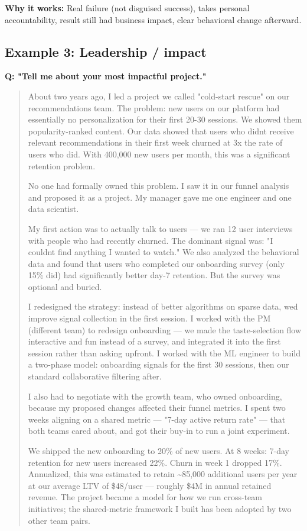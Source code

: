 \documentclass[11pt]{article}
\begin{document}
\textbf{Why it works:} Real failure (not disguised success), takes personal accountability, result still had business impact, clear behavioral change afterward.

\subsection{Example 3: Leadership / impact}\label{example-3-leadership--impact}

\textbf{Q: "Tell me about your most impactful project."}

\begin{quote}
About two years ago, I led a project we called "cold-start rescue" on our recommendations team. The problem: new users on our platform had essentially no personalization for their first 20-30 sessions. We showed them popularity-ranked content. Our data showed that users who didn\textquotesingle t receive relevant recommendations in their first week churned at 3x the rate of users who did. With 400,000 new users per month, this was a significant retention problem.

No one had formally owned this problem. I saw it in our funnel analysis and proposed it as a project. My manager gave me one engineer and one data scientist.

My first action was to actually talk to users --- we ran 12 user interviews with people who had recently churned. The dominant signal was: "I couldn\textquotesingle t find anything I wanted to watch." We also analyzed the behavioral data and found that users who completed our onboarding survey (only 15\% did) had significantly better day-7 retention. But the survey was optional and buried.

I redesigned the strategy: instead of better algorithms on sparse data, we\textquotesingle d improve signal collection in the first session. I worked with the PM (different team) to redesign onboarding --- we made the taste-selection flow interactive and fun instead of a survey, and integrated it into the first session rather than asking upfront. I worked with the ML engineer to build a two-phase model: onboarding signals for the first 30 sessions, then our standard collaborative filtering after.

I also had to negotiate with the growth team, who owned onboarding, because my proposed changes affected their funnel metrics. I spent two weeks aligning on a shared metric --- "7-day active return rate" --- that both teams cared about, and got their buy-in to run a joint experiment.

We shipped the new onboarding to 20\% of new users. At 8 weeks: 7-day retention for new users increased 22\%. Churn in week 1 dropped 17\%. Annualized, this was estimated to retain \textasciitilde85,000 additional users per year at our average LTV of \$48/user --- roughly \$4M in annual retained revenue. The project became a model for how we run cross-team initiatives; the shared-metric framework I built has been adopted by two other team pairs.
\end{quote}
\end{document}
